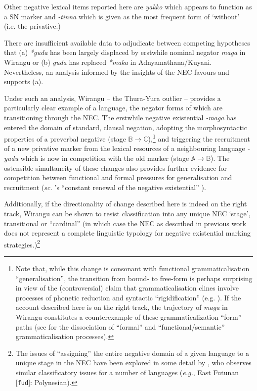 {{	Other negative lexical items reported here are \textit{yakko} which appears to function as a SN marker and \textit{-tinna} which is given as the most frequent form of `without' (i.e. the privative.)}

 There are insufficient available data to adjudicate between competing hypotheses that (a) \textit{*guda} has been largely displaced by erstwhile nominal negator \textit{maga} in Wirangu or (b) \textit{guda} has replaced \textit{*maka} in Adnyamathana/Kuyani. Nevertheless, an analysis informed by the insights of the \acrshort{NEC} favours and supports (a).
 
Under such an analysis, Wirangu -- the Thura-Yura outlier -- provides a particularly clear example of a language, the negator forms of which are transitioning through the NEC. The erstwhile negative existential \textit{-maga} has entered the domain of standard, clausal negation, adopting the morphosyntactic properties of a preverbal negative (stage $\mathbb{B\to C}$),\footnote{Note that, while this change is consonant with functional grammaticalisation ``generalisation'', the transition from bound- to free-form is perhaps surprising in view of the (controversial) claim that grammaticalisation clines involve processes of phonetic reduction and syntactic ``rigidification'' (e.g. \citealp{Geurts2000}). If the account described here is on the right track, the trajectory of \textit{maga} in Wirangu constitutes a counterexample of these grammaticalization ``form'' paths (see \citealp[40]{vanderAuwera2008,Ahern} for the dissociation of ``formal'' and ``functional/semantic'' grammaticalisation processes).} and triggering the recruitment of a new privative marker from the lexical resources of a neighbouring language \textit{-yudu} which is now in competition with the old marker (stage $\mathbb{A\to B}$). The ostensible simultaneity of these changes also provides further evidence for competition between functional and formal pressures for generalisation and recruitment (\textit{sc.} \citeauthor{Veselinova2016}'s ``constant renewal of the negative existential'' \citeyearpar[173]{Veselinova2016}).%

Additionally, if the directionality of change described here is indeed on the right track, Wirangu can be shown to resist classification into any unique \acrshort{NEC} `stage', transitional or ``cardinal'' (in which case the \acrshort{NEC} as described in previous work does not represent a complete linguistic typology for negative existential marking strategies.)\footnote{The issues of ``assigning'' the entire negative domain of a given language to a unique stage in the \acrshort{NEC} have been explored in some detail by \citep{Veselinova2016}, who observes similar classificatory issues for a number of languages (\textit{e.g.}, East Futunan [\texttt{fud}]: Polynesian).}










}

